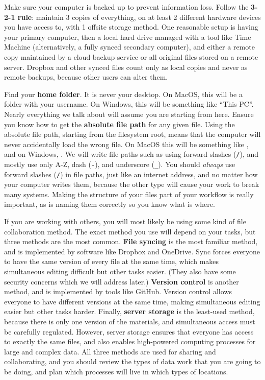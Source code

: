 Make sure your computer is backed up to prevent information loss.
Follow the \textbf{3-2-1 rule}: maintain 3 copies of everything,
on at least 2 different hardware devices you have access to,
with 1 offsite storage method.
One reasonable setup is having your primary computer,
then a local hard drive managed with a tool like Time Machine
(alternatively, a fully synced secondary computer),
and either a remote copy maintained by a cloud backup service
or all original files stored on a remote server.
Dropbox and other synced files count only as local copies and never as remote backups,
because other users can alter them.

Find your \textbf{home folder}. It is never your desktop.
On MacOS, this will be a folder with your username.
On Windows, this will be something like ``This PC''.
Nearly everything we talk about will assume you are starting from here.
Ensure you know how to get the \textbf{absolute file path} for any given file.
Using the absolute file path, starting from the filesystem root,
means that the computer will never accidentally load the wrong file.
On MacOS this will be something like ,
and on Windows, .
We will write file paths such as 
using forward slashes (\texttt{/}), and mostly use only A-Z, dash (\texttt{-}), and underscore (\texttt{\_}).
You should \textit{always} use forward slashes (\texttt{/}) in file paths,
just like an internet address, and no matter how your computer writes them,
because the other type will cause your work to break many systems.
Making the structure of your files part of your workflow is really important,
as is naming them correctly so you know what is where.

If you are working with others, you will most likely be using some kind
of file collaboration method.
The exact method you use will depend on your tasks,
but three methods are the most common.
\textbf{File syncing} is the most familiar method,
and is implemented by software like Dropbox and OneDrive.
Sync forces everyone to have the same version of every file at the same time,
which makes simultaneous editing difficult but other tasks easier.
(They also have some security concerns which we will address later.)
\textbf{Version control} is another method,
and is implemented by tools like GitHub.
Version control allows everyone to have different versions at the same time,
making simultaneous editing easier but other tasks harder.
Finally, \textbf{server storage} is the least-used method,
because there is only one version of the materials,
and simultaneous access must be carefully regulated.
However, server storage ensures that everyone has access
to exactly the same files, and also enables
high-powered computing processes for large and complex data.
All three methods are used for sharing and collaborating,
and you should review the types of data work
that you are going to be doing, and plan which processes
will live in which types of locations.

